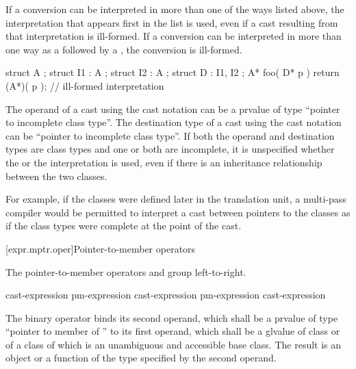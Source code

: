 If a conversion can be interpreted in more than one of the ways listed
above, the interpretation that appears first in the list is used, even
if a cast resulting from that interpretation is ill-formed. If a
conversion can be interpreted in more than one way as a
 followed by a , the conversion is
ill-formed.
\begin{example}
\begin{codeblock}
struct A { };
struct I1 : A { };
struct I2 : A { };
struct D : I1, I2 { };
A* foo( D* p ) {
  return (A*)( p );             // ill-formed  interpretation
}
\end{codeblock}
\end{example}

\pnum
{}%
The operand of a cast using the cast notation can be a prvalue of type
``pointer to incomplete class type''. The destination type of a cast
using the cast notation can be ``pointer to incomplete class type''. If
both the operand and destination types are class types and one or both
are incomplete, it is unspecified whether the  or the
 interpretation is used, even if there is an
inheritance relationship between the two classes.
\begin{note}
For example, if the classes were defined later in the translation unit,
a multi-pass compiler would be permitted to interpret a cast between
pointers to the classes as if the class types were complete at the point
of the cast.
\end{note}

[expr.mptr.oper]{Pointer-to-member operators}

\pnum
{}%
%
%
%
%
%
The pointer-to-member operators \tcode{->*} and  group
left-to-right.

\begin{bnf}
\br
    cast-expression\br
    pm-expression  cast-expression\br
    pm-expression \terminal{->*} cast-expression
\end{bnf}

\pnum
The binary operator  binds its second operand, which shall be
a prvalue
of type ``pointer to member of '' to its first operand, which shall be
a glvalue
of
class  or of a class of which  is an unambiguous and
accessible base class. The result is an object or a function of the type
specified by the second operand.

